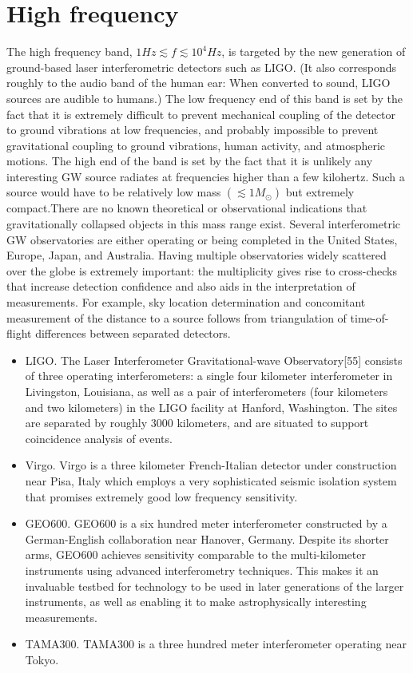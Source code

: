 \documentclass[binding=0.6cm, LaM]{sapthesis}
\begin{document}
\section{High frequency}
The high frequency band, $1Hz \apprle f \apprle 10^4 Hz$, is targeted by the new generation of ground-based laser interferometric detectors such as LIGO. 
(It also corresponds roughly to the audio band of the human ear: When converted to sound, LIGO sources are audible to humans.) 
The low frequency end of this band is set by the fact that it is extremely difficult to prevent mechanical coupling of the detector to ground vibrations at low frequencies, 
and probably impossible to prevent gravitational coupling to ground vibrations, human activity, and atmospheric motions.
The high end of the band is set by the fact that it is unlikely any interesting GW source radiates at frequencies higher than a few kilohertz. Such a source would have to be relatively 
low mass $(\apprle 1M_{\odot})$ but extremely compact.There are no known theoretical or observational indications that gravitationally collapsed objects in this mass range exist.
Several interferometric GW observatories are either operating or being completed in the United States, Europe, Japan, and Australia. 
Having multiple observatories widely scattered over the globe is extremely important: the multiplicity gives rise to cross-checks that increase detection confidence and also aids in the interpretation
 of measurements. For example, sky location determination and concomitant measurement of the distance to a source follows from triangulation of time-of-flight differences between separated detectors.
\begin{itemize}
  \item LIGO. The Laser Interferometer Gravitational-wave Observatory[55] consists of three operating interferometers: 
a single four kilometer interferometer in Livingston, Louisiana, as well as a pair of interferometers (four kilometers and two kilometers) in the LIGO facility at Hanford, Washington. 
The sites are separated by roughly 3000 kilometers, and are situated to support coincidence analysis of events.
  \item Virgo. Virgo is a three kilometer French-Italian detector under construction near Pisa, Italy which employs a very sophisticated seismic isolation system that promises extremely good low 
frequency sensitivity.
  \item GEO600. GEO600 is a six hundred meter interferometer constructed by a German-English collaboration near Hanover, Germany.
 Despite its shorter arms, GEO600 achieves sensitivity comparable to the multi-kilometer instruments using advanced interferometry techniques.
 This makes it an invaluable testbed for technology to be used in later generations of the larger instruments, as well as enabling it to make astrophysically interesting measurements.
  \item TAMA300. TAMA300 is a three hundred meter interferometer operating near Tokyo. 
   
\end{itemize}
\end{document}
